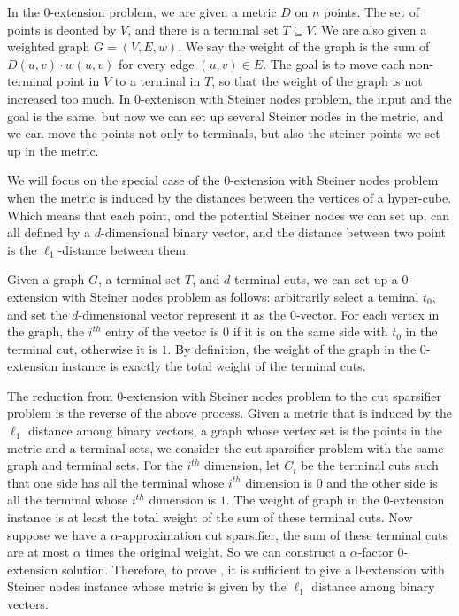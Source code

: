 \documentclass[11pt]{article}
\theoremstyle{definition}
\begin{document}
In the 0-extension problem, we are given a metric $D$ on $n$ points. The set of points is deonted by $V$, and there is a terminal set $T \subseteq V$. We are also given a weighted graph $G=(V,E,w)$. We say the weight of the graph is the sum of $D(u,v)\cdot w(u,v)$ for every edge $(u,v)\in E$. The goal is to move each non-terminal point in $V$ to a terminal in $T$, so that the weight of the graph is not increased too much. In 0-extenison with Steiner nodes problem, the input and the goal is the same, but now we can set up several Steiner nodes in the metric, and we can move the points not only to terminals, but also the steiner points we set up in the metric. 

We will focus on the special case of the 0-extension with Steiner nodes problem when the metric is induced by the distances between the vertices of a hyper-cube. Which means that each point, and the potential Steiner nodes we can set up, can all defined by a $d$-dimensional binary vector, and the distance between two point is the $\ell_1$-distance between them.

Given a graph $G$, a terminal set $T$, and $d$ terminal cuts, we can set up a 0-extension with Steiner nodes problem as follows: arbitrarily select a teminal $t_0$, and set the $d$-dimensional vector represent it as the $0$-vector. For each vertex in the graph, the $i^{th}$ entry of the vector is $0$ if it is on the same side with $t_0$ in the terminal cut, otherwise it is $1$. By definition, the weight of the graph in the 0-extension instance is exactly the total weight of the terminal cuts.

The reduction from 0-extension with Steiner nodes problem to the cut sparsifier problem is the reverse of the above process. Given a metric that is induced by the $\ell_1$ distance among binary vectors, a graph whose vertex set is the points in the metric and a terminal sets, we consider the cut sparsifier problem with the same graph and terminal sets. For the $i^{th}$ dimension, let $C_i$ be the terminal cuts such that one side has all the terminal whose $i^{th}$ dimension is $0$ and the other side is all the terminal whose $i^{th}$ dimension is $1$. The weight of graph in the 0-extension instance is at least the total weight of the sum of these terminal cuts. Now suppose we have a $\alpha$-approximation cut sparsifier, the sum of these terminal cuts are at most $\alpha$ times the original weight. So we can construct a $\alpha$-factor 0-extension solution. Therefore, to prove , it is sufficient to give a 0-extension with Steiner nodes instance whose metric is given by the $\ell_1$ distance among binary vectors.
\end{document}
